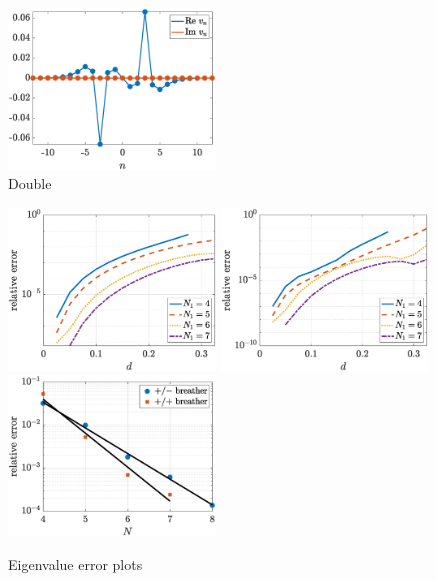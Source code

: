 \documentclass[12pt,reqno]{amsart}
\begin{document}
\begin{figure}
\begin{center}
	\includegraphics[width=5.5cm]{doubleppinteig.eps} 
	\end{center}
	\caption{Double}
	\label{fig:double}
\end{figure}

\begin{figure}
	\begin{center}
	\includegraphics[width=5.5cm]{doubleeigerrord.eps} \hspace{-0.5cm}
	\includegraphics[width=5.5cm]{doubleppeigerrord.eps} \hspace{-0.5cm}
	\includegraphics[width=5.5cm]{doubleeigerrorN.eps} 
	\end{center}
	\caption{Eigenvalue error plots}
	\label{fig:eigerror}
\end{figure}
\end{document}
